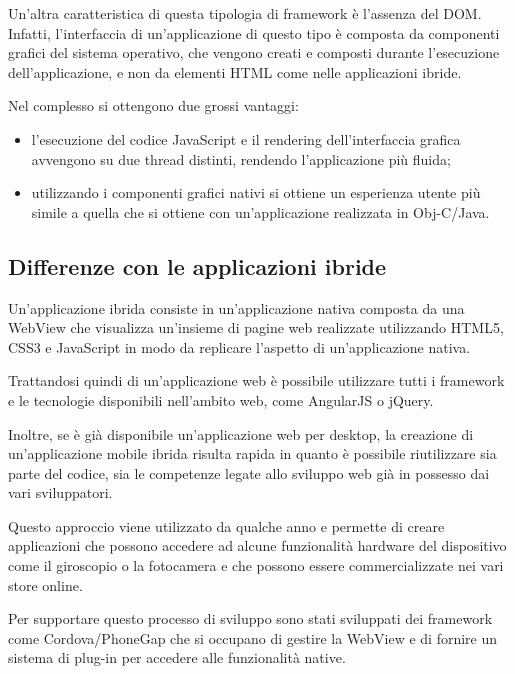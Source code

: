 Un'altra caratteristica di questa tipologia di framework è l'assenza del \gls{DOM}.
Infatti, l'interfaccia di un'applicazione di questo tipo è composta da componenti grafici del sistema operativo, che vengono creati e composti durante l'esecuzione dell'applicazione, e non da elementi HTML come nelle applicazioni ibride.

Nel complesso si ottengono due grossi vantaggi:
\begin{itemize}
\item l'esecuzione del codice JavaScript e il \gls{rendering} dell'interfaccia grafica avvengono su due thread distinti, rendendo l'applicazione più fluida;
\item utilizzando i componenti grafici nativi si ottiene un esperienza utente più simile a quella che si ottiene con un'applicazione realizzata in \gls{Obj-C}/Java.
\end{itemize}

\subsection{Differenze con le applicazioni ibride}

Un'applicazione ibrida consiste in un'applicazione nativa composta da una \gls{WebView} che visualizza un'insieme di pagine web realizzate utilizzando HTML5, CSS3 e JavaScript in modo da replicare l'aspetto di un'applicazione nativa.

Trattandosi quindi di un'applicazione web è possibile utilizzare tutti i framework e le tecnologie disponibili nell'ambito web, come AngularJS o jQuery.

Inoltre, se è già disponibile un'applicazione web per desktop, la creazione di un'applicazione mobile ibrida risulta rapida in quanto è possibile riutilizzare sia parte del codice, sia le competenze legate allo sviluppo web già in possesso dai vari sviluppatori.

Questo approccio viene utilizzato da qualche anno e permette di creare applicazioni che possono accedere ad alcune funzionalità hardware del dispositivo come il giroscopio o la fotocamera e che possono essere commercializzate nei vari store online.

Per supportare questo processo di sviluppo sono stati sviluppati dei framework come Cordova/\gls{PhoneGap} che si occupano di gestire la WebView e di fornire un sistema di plug-in per accedere alle funzionalità native.

